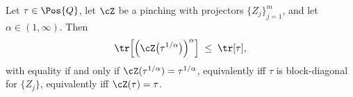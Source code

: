 
\begin{lemma}\label{lem:pinchmono}
Let $\tau\in\Pos{Q}$, let $\cZ$ be a pinching with projectors
$\{Z_j\}_{j=1}^{m}$, and let $\alpha\in(1,\infty)$. Then
\begin{equation}\label{eq:pinchmono}
  \tr\!\left[\left(\cZ\big(\tau^{1/\alpha}\big)\right)^{\alpha}\right]
  \;\le\;\tr[\tau],
\end{equation}
with equality if and only if $\cZ(\tau^{1/\alpha})=\tau^{1/\alpha}$,
equivalently iff $\tau$ is block-diagonal for $\{Z_j\}$, equivalently iff
$\cZ(\tau)=\tau$.
\end{lemma}

